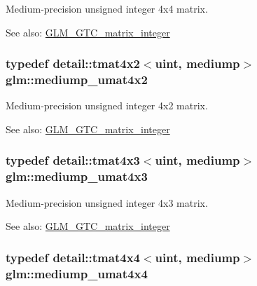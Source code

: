 Medium-precision unsigned integer 4x4 matrix. \begin{Desc}
\item[See also:]\hyperlink{group__gtc__matrix__integer}{GLM\_\-GTC\_\-matrix\_\-integer} \end{Desc}
\hypertarget{group__gtc__matrix__integer_g8ea45737e8bc9bfae2668968056b109f}{
\subsubsection[mediump\_\-umat4x2]{\setlength{\rightskip}{0pt plus 5cm}typedef detail::tmat4x2$<$uint, mediump$>$ {\bf glm::mediump\_\-umat4x2}}}
\label{group__gtc__matrix__integer_g8ea45737e8bc9bfae2668968056b109f}


Medium-precision unsigned integer 4x2 matrix. \begin{Desc}
\item[See also:]\hyperlink{group__gtc__matrix__integer}{GLM\_\-GTC\_\-matrix\_\-integer} \end{Desc}
\hypertarget{group__gtc__matrix__integer_gebe3b1b4b6030c096447e40fb00528f4}{
\subsubsection[mediump\_\-umat4x3]{\setlength{\rightskip}{0pt plus 5cm}typedef detail::tmat4x3$<$uint, mediump$>$ {\bf glm::mediump\_\-umat4x3}}}
\label{group__gtc__matrix__integer_gebe3b1b4b6030c096447e40fb00528f4}


Medium-precision unsigned integer 4x3 matrix. \begin{Desc}
\item[See also:]\hyperlink{group__gtc__matrix__integer}{GLM\_\-GTC\_\-matrix\_\-integer} \end{Desc}
\hypertarget{group__gtc__matrix__integer_g24b1c76fefa58f810e24cafe0ea6a6a0}{
\subsubsection[mediump\_\-umat4x4]{\setlength{\rightskip}{0pt plus 5cm}typedef detail::tmat4x4$<$uint, mediump$>$ {\bf glm::mediump\_\-umat4x4}}}
\label{group__gtc__matrix__integer_g24b1c76fefa58f810e24cafe0ea6a6a0}



